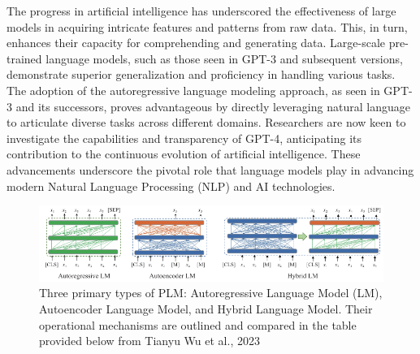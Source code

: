 \documentclass[fleqn,10pt]{thescipub} %
\begin{document}
The progress in artificial intelligence has underscored the effectiveness of large models in acquiring intricate features and patterns from raw data. This, in turn, enhances their capacity for comprehending and generating data. Large-scale pre-trained language models, such as those seen in GPT-3 and subsequent versions, demonstrate superior generalization and proficiency in handling various tasks. The adoption of the autoregressive language modeling approach, as seen in GPT-3 and its successors, proves advantageous by directly leveraging natural language to articulate diverse tasks across different domains. Researchers are now keen to investigate the capabilities and transparency of GPT-4, anticipating its contribution to the continuous evolution of artificial intelligence. These advancements underscore the pivotal role that language models play in advancing modern Natural Language Processing (NLP) and AI technologies.

\begin{figure}
    \centering
    \includegraphics[width=\textwidth]{LMTYPES}
    \caption{Three primary types of PLM: Autoregressive Language Model (LM), Autoencoder Language Model, and Hybrid Language Model. Their operational mechanisms are outlined and compared in the table provided below from Tianyu Wu et al., 2023}
    \label{fig:your_image_label}
\end{figure}
\end{document}
